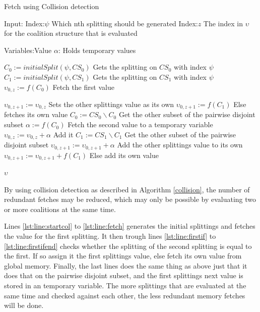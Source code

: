 \documentclass{llncs}
\begin{document}
\begin{algorithm}[htbp]
\caption{Fetch using Collision detection \label{collision}}
Input:
Index:$\psi$ \hfill Which nth splitting should be generated
Index:$z$ \hfill The index in $\upsilon$ for the coalition structure that is evaluated 

Variables:Value $\alpha $: \hfill Holds temporary values

\begin{algorithmic}[1]
    \STATE $C_{0} := initialSplit(\psi,CS_0)$ \label{lst:line:startcol} \hfill Gets the splitting on $CS_0$ with index $\psi$
    \STATE $C_{1} := initialSplit(\psi,CS_1)$ \hfill Gets the splitting on $CS_1$ with index $\psi$
    \STATE $\upsilon_{0,z} := f(C_{0})$ \label{lst:line:fetch} \hfill Fetch the first value
    
     \label{lst:line:firstif} 
      \STATE $\upsilon_{0,z+1} := \upsilon_{0,z}$ \hfill Sets the other splittings value as its own
      \ELSE
      \STATE $\upsilon_{0,z+1} := f(C_{1})$ \hfill Else fetches its own value
     \ENDIF \label{lst:line:firstifend}
    \STATE $C_{0} := CS_0\backslash C_{0}$ \label{lst:line:startend} \hfill Get the other subset of the pairwise disjoint subset
    \STATE $\alpha := f(C_{0})$ \hfill Fetch the second value to a temporary variable
    \STATE $\upsilon_{0,z} := \upsilon_{0,z}  + \alpha$ \label{lst:line:endend} \hfill Add it
    \STATE $C_{1} := CS_1\backslash C_{1}$ \hfill Get the other subset of the pairwise disjoint subset
      \STATE $\upsilon_{0,z+1} := \upsilon_{0,z+1}  + \alpha$ \hfill Add the other splittings value to its own
    \ELSE
      \STATE $\upsilon_{0,z+1} := \upsilon_{0,z+1} + f(C_{1})$ \hfill Else add its own value
    \ENDIF
    
\RETURN $\upsilon$
\end{algorithmic}
\end{algorithm}
By using collision detection as described in Algorithm \ref{collision}, the number of redundant fetches may be reduced,
which may only be possible by evaluating two or more coalitions at the same time. 

Lines \ref{lst:line:startcol} to \ref{lst:line:fetch} generates
the initial splittings and fetches the value for the first splitting. It then trough lines \ref{lst:line:firstif} to \ref{lst:line:firstifend}
checks whether the splitting of the second splitting is equal to the first. 
If so assign it the first splittings value, else fetch its own value from global memory. 
Finally, the last lines does the same thing as above just that it does that on the pairwise disjoint subset, 
and the first splittings next value is stored in an temporary variable. 
The more splittings that are evaluated at the same time and checked against each other, the less redundant memory fetches will be done.
\end{document}
